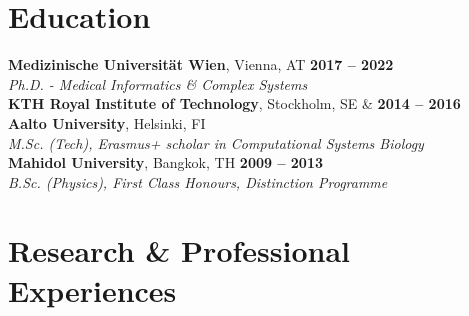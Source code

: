 \documentclass[margin,line]{resume}
\begin{document}
\begin{resume}

    

    \section{\mysidestyle Education}

  \textbf{Medizinische Universit{\"a}t Wien},  Vienna, AT \hfill \textbf{2017 -- 2022} \vspace{1mm}\\
    \textsl{Ph.D. - Medical Informatics \& Complex Systems}   \vspace{3mm}\\ 
   \textbf{KTH Royal Institute of Technology},  Stockholm, SE \&  \hfill \textbf{2014 -- 2016}\vspace{1mm}\\
     \textbf{Aalto University},  Helsinki, FI \vspace{1mm}\\
    \textsl{M.Sc. (Tech), Erasmus+ scholar in Computational Systems Biology}  \vspace{3mm} \\ 
    \textbf{Mahidol University},  Bangkok, TH  \hfill \textbf{2009 -- 2013}\vspace{1mm}\\
    \textsl{B.Sc. (Physics), First Class Honours, Distinction Programme} \\
    
    
    \section{\mysidestyle Research \& Professional Experiences} 



\end{resume}
\end{document}
